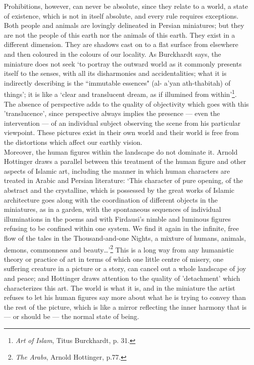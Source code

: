 \documentclass[10pt, twoside,openright]{book}
\begin{document}
Prohibitions, however, can never be absolute, since they relate to a world, a state of existence, 
which is not in itself absolute, and every rule requires exceptions. Both people and animals are 
lovingly delineated in Persian miniatures; but they are not the people of this earth nor the animals 
of this earth. They exist in a different dimension. They are shadows cast on to a flat surface from 
elsewhere and then coloured in the colours of our locality. As Burckhardt says, the miniature does 
not seek `to portray the outward world as it commonly presents itself to the senses, with all its 
disharmonies and accidentalities; what it is indirectly describing is the ``immutable essences" (al\hyp{}
a'yan ath\hyp{}thabitah) of things'; it is like a `clear and translucent dream, as if illumined from 
within'\footnote{\emph{Art of Islam}, Titus Burckhardt, p. 31.}. The absence of perspective adds to the quality of objectivity which goes with this 
'translucence', since perspective always implies the presence --- even the intervention --- of an 
individual subject observing the scene from his particular viewpoint. These pictures exist in their 
own world and their world is free from the distortions which affect our earthly vision. \\

Moreover, the human figures within the landscape do not dominate it. Arnold Hottinger draws a 
parallel between this treatment of the human figure and other aspects of Islamic art, including the 
manner in which human characters are treated in Arabic and Persian literature: `This character of 
pure opening, of the abstract and the crystalline, which is possessed by the great works of Islamic 
architecture goes along with the coordination of different objects in the miniatures, as in a garden, 
with the spontaneous sequences of individual illuminations in the poems and with Firdausi's nimble 
and luminous figures refusing to be confined within one system. We find it again in the infinite, 
free flow of the tales in the Thousand\hyp{}and\hyp{}one Nights, a mixture of humans, animals, demons, 
commonness and beauty\ldots{}'\footnote{\emph{The Arabs}, Arnold Hottinger, p.77.} This is a long way from any humanistic theory or practice of art in 
terms of which one little centre of misery, one suffering creature in a picture or a story, can 
cancel out a whole landscape of joy and peace; and Hottinger draws attention to the quality of 
'detachment' which characterizes this art. The world is what it is, and in the miniature the artist 
refuses to let his human figures say more about what he is trying to convey than the rest of the 
picture, which is like a mirror reflecting the inner harmony that is --- or should be --- the normal 
state of being. \\
\end{document}
